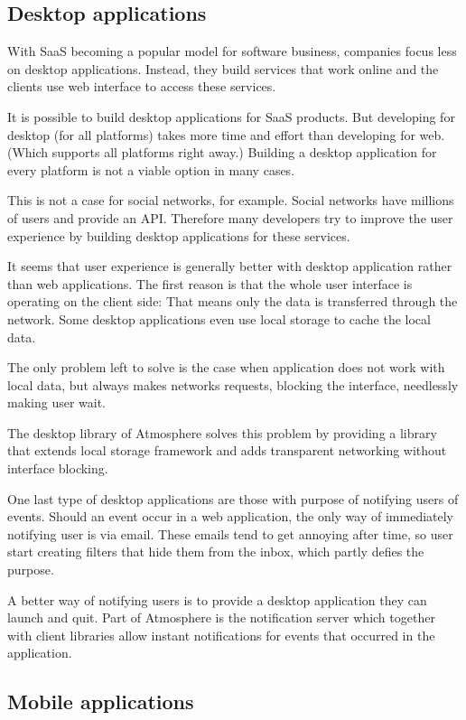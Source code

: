\subsection{Desktop applications}

With SaaS becoming a popular model for software business, companies focus less on desktop applications. Instead, they build services that work online and the clients use web interface to access these services.

It is possible to build desktop applications for SaaS products. But developing for desktop (for all platforms) takes more time and effort than developing for web. (Which supports all platforms right away.) Building a desktop application for every platform is not a viable option in many cases.

This is not a case for social networks, for example. Social networks have millions of users and provide an API. Therefore many developers try to improve the user experience by building desktop applications for these services.

It seems that user experience is generally better with desktop application rather than web applications. The first reason is that the whole user interface is operating on the client side: That means only the data is transferred through the network. Some desktop applications even use local storage to cache the local data.

The only problem left to solve is the case when application does not work with local data, but always makes networks requests, blocking the interface, needlessly making user wait.

The desktop library of Atmosphere solves this problem by providing a library that extends local storage framework and adds transparent networking without interface blocking. 

One last type of desktop applications are those with purpose of notifying users of events. Should an event occur in a web application, the only way of immediately notifying user is via email. These emails tend to get annoying after time, so user start creating filters that hide them from the inbox, which partly defies the purpose.

A better way of notifying users is to provide a desktop application they can launch and quit. Part of Atmosphere is the notification server which together with client libraries allow instant notifications for events that occurred in the application. 

\subsection{Mobile applications}

